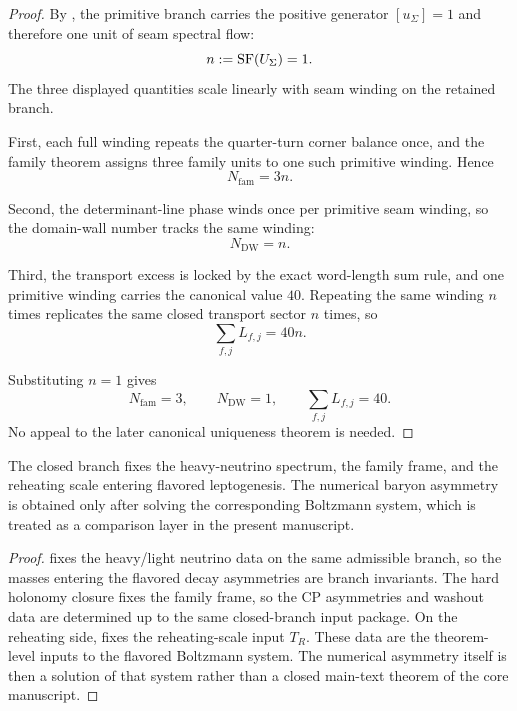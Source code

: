 \begin{proof}
By , the primitive branch carries the positive generator
$[u_\Sigma]=1$ and therefore one unit of seam spectral flow:
\[
n:=\operatorname{SF}(U_\Sigma)=1.
\]
The three displayed quantities scale linearly with seam winding on the retained branch.

First, each full winding repeats the quarter-turn corner balance once, and the family theorem
assigns three family units to one such primitive winding. Hence
\[
N_{\mathrm{fam}}=3n.
\]

Second, the determinant-line phase winds once per primitive seam winding, so the domain-wall number
tracks the same winding:
\[
N_{\mathrm{DW}}=n.
\]

Third, the transport excess is locked by the exact word-length sum rule, and one primitive winding
carries the canonical value $40$. Repeating the same winding $n$ times replicates the same closed
transport sector $n$ times, so
\[
\sum_{f,j}L_{f,j}=40n.
\]

Substituting $n=1$ gives
\[
N_{\mathrm{fam}}=3,
\qquad
N_{\mathrm{DW}}=1,
\qquad
\sum_{f,j}L_{f,j}=40.
\]
No appeal to the later canonical uniqueness theorem is needed.
\end{proof}

\begin{theorem}
\label{thm:leptogenesis-closure}
The closed branch fixes the heavy-neutrino spectrum, the family frame, and the reheating scale
entering flavored leptogenesis. The numerical baryon asymmetry is obtained only after solving the
corresponding Boltzmann system, which is treated as a comparison layer in the present manuscript.
\end{theorem}

\begin{proof}
 fixes the heavy/light neutrino data on the same admissible branch, so
the masses entering the flavored decay asymmetries are branch invariants. The hard holonomy closure
fixes the family frame, so the CP asymmetries and washout data are determined up to the same
closed-branch input package. On the reheating side,  fixes the
reheating-scale input $T_R$. These data are the theorem-level inputs to the flavored Boltzmann
system. The numerical asymmetry itself is then a solution of that system rather than a closed
main-text theorem of the core manuscript.
\end{proof}

